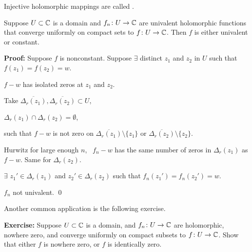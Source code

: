 \documentclass[10pt,aspectratio=169]{beamer}
\begin{document}
\begin{frame}
Injective holomorphic
mappings are called \emph{}.

\pause

\begin{corollary}
Suppose $U \subset {\mathbb{C}}$ is a domain and $f_n \colon U \to {\mathbb{C}}$ are
univalent holomorphic functions that converge uniformly on compact sets
to $f \colon U \to {\mathbb{C}}$.  Then $f$ is either univalent or constant.
\end{corollary}

\pause
\textbf{Proof:}
Suppose $f$ is nonconstant.
\pause
Suppose $\exists$ distinct $z_1$ and $z_2$ in $U$ such that $f(z_1) =
f(z_2) = w$.

\pause
\medskip

$f-w$ has isolated zeros at $z_1$ and $z_2$.

\medskip
\pause
Take $\overline{\Delta_r(z_1)},\overline{\Delta_r(z_2)} \subset U$,

\pause
$\Delta_r(z_1) \cap \Delta_r(z_2) = \emptyset$,

\pause 
such that $f-w$ is not zero on
$\overline{\Delta_r(z_1)} \setminus \{ z_1 \}$ or
$\overline{\Delta_r(z_2)} \setminus \{ z_2 \}$.

\medskip
\pause

Hurwitz \wthus for large enough $n$, ~$f_n-w$ has the same number of
zeros in $\Delta_r(z_1)$ as $f-w$. \pause Same for $\Delta_r(z_2)$.

\pause
\medskip
\thus \quad $\exists$ $z_1' \in \Delta_r(z_1)$ and
$z_2' \in \Delta_r(z_2)$ such that $f_n(z_1')=f_n(z_2')=w$.

\pause
\medskip

\thus \quad
$f_n$ not univalent. \qed
\end{frame}

\begin{frame}
Another common application is the following exercise.

\medskip
\pause

\textbf{Exercise:}
Suppose $U \subset {\mathbb{C}}$ is a domain,
and
$f_n \colon U \to {\mathbb{C}}$ are holomorphic, nowhere zero,
and converge uniformly on compact subsets to $f \colon U \to {\mathbb{C}}$.
\pause
Show that either $f$ is nowhere zero, or $f$ is identically zero.
\end{frame}
\end{document}
